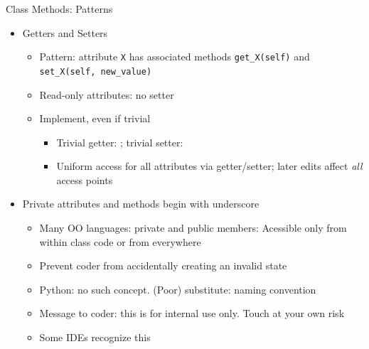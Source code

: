 \begin{frame}{Class Methods: Patterns}
%
\begin{itemize}
\item Getters and Setters
	\begin{itemize}
	\item Pattern: attribute \texttt{X} has associated methods \texttt{get\_X(self)} and \texttt{set\_X(self, new\_value)}
	\item Read-only attributes: no setter
	\item Implement, even if trivial
		\begin{itemize}
		\item Trivial getter: ; trivial setter: 
		\item[\Thus] Uniform access for all attributes via getter/setter; later edits affect \emph{all} access points
		\end{itemize}
	\end{itemize}
\item Private attributes and methods begin with underscore
	\begin{itemize}
	\item Many OO languages: private and public members: Acessible only from within class code or from everywhere
	\item[\Thus] Prevent coder from accidentally creating an invalid state
	\item Python: no such concept. (Poor) substitute: naming convention
	\item Message to coder: this is for internal use only. Touch at your own risk
	\item Some IDEs recognize this
	\end{itemize}
\end{itemize}
%
\end{frame}


